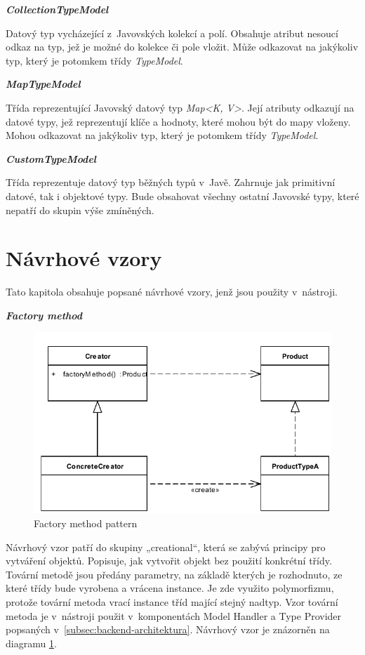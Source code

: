 \documentclass[11pt,twoside,a4paper]{book}
\begin{document}
\textbf{\textit{CollectionTypeModel}}

Datový typ vycházející z~Javovských kolekcí a polí. Obsahuje atribut nesoucí odkaz na typ,
jež je možné do kolekce či pole vložit. Může odkazovat na jakýkoliv typ, který je potomkem
třídy {\em TypeModel}.

\textbf{\textit{MapTypeModel}}

Třída reprezentující Javovský datový typ {\em Map<K, V>}. Její atributy odkazují
na datové typy, jež reprezentují klíče a hodnoty, které mohou být do mapy
vloženy. Mohou odkazovat na jakýkoliv typ, který je potomkem třídy {\em
TypeModel}.

\textbf{\textit{CustomTypeModel}}

Třída reprezentuje datový typ běžných typů v~Javě. Zahrnuje jak primitivní datové, tak i
objektové typy. Bude obsahovat všechny ostatní Javovské typy, které nepatří do skupin výše
zmíněných.

\section{Návrhové vzory}

Tato kapitola obsahuje popsané návrhové vzory, jenž jsou použity v~nástroji.

\textbf{\textit{Factory method}}

\begin{figure}[h]
\begin{center}
\includegraphics[width=13cm]{images-pdf/FactoryMethodDesignPattern.pdf}
\caption{Factory method pattern}
\label{fig:factory-pattern}
\end{center}
\end{figure}

Návrhový vzor patří do skupiny „creational“, která se zabývá principy pro 
vytváření objektů. Popisuje, jak vytvořit objekt bez použití konkrétní třídy. 
Tovární metodě jsou předány parametry, na základě kterých je rozhodnuto, ze 
které třídy bude vyrobena a vrácena instance. Je zde využito polymorfizmu, 
protože tovární metoda vrací instance tříd mající stejný nadtyp. Vzor tovární 
metoda je v~nástroji použit v~komponentách Model Handler a Type Provider 
popsaných v~\ref{subsec:backend-architektura}. Návrhový vzor je znázorněn na
diagramu \ref{fig:factory-pattern}.
\end{document}
